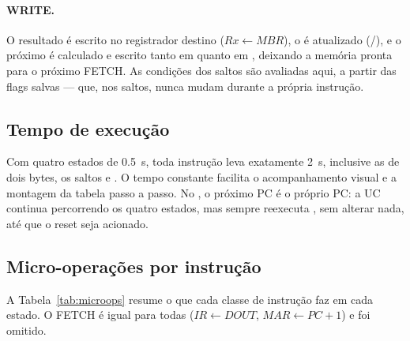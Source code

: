 \paragraph{WRITE.} O resultado é escrito no registrador destino
($Rx \gets MBR$), o  é atualizado (/), e o
próximo  é calculado e escrito tanto em  quanto em ,
deixando a memória pronta para o próximo FETCH. As condições dos saltos são
avaliadas aqui, a partir das flags salvas --- que, nos saltos, nunca mudam
durante a própria instrução.

\subsection{Tempo de execução}

Com quatro estados de \SI{0,5}{\second}, toda instrução leva exatamente
\SI{2}{\second}, inclusive as de dois bytes, os saltos e . O tempo
constante facilita o acompanhamento visual e a montagem da tabela passo a
passo. No , o próximo PC é o próprio PC: a UC continua percorrendo
os quatro estados, mas sempre reexecuta , sem alterar nada, até que
o reset seja acionado.

\subsection{Micro-operações por instrução}

A Tabela~\ref{tab:microops} resume o que cada classe de instrução faz em cada
estado. O FETCH é igual para todas ($IR \gets DOUT$, $MAR \gets PC+1$) e foi
omitido.

